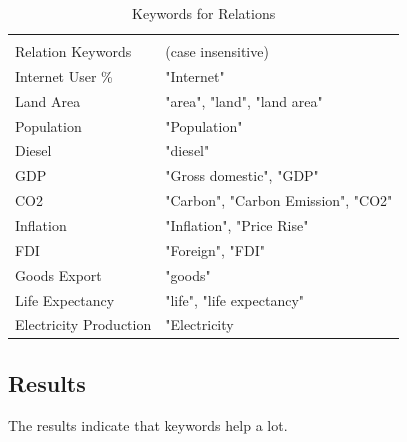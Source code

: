 \documentclass[a4paper,10pt]{article}
\begin{document}
\begin{center}
\begin{table}[H]
 \begin{tabular}{|l|l|}
\hline \\
 Relation Keywords & (case insensitive)\\
\hline
 Internet User \% &"Internet"\\
Land Area &"area", "land", "land area"\\
Population &"Population"\\
Diesel &"diesel"\\
GDP &"Gross domestic", "GDP"\\
CO2 &"Carbon", "Carbon Emission", "CO2"\\
Inflation &"Inflation", "Price Rise"\\
FDI &"Foreign", "FDI"\\
Goods Export & "goods"\\
Life Expectancy & "life", "life expectancy"\\
Electricity Production & "Electricity\\
\hline
\end{tabular}
\caption{Keywords for Relations}
\label{fig:kw}
\end{table}
 \end{center}

\subsection{Results}
The results indicate that keywords help a lot. 
\begin{table}[H]
\caption{Keyword Based}
\label{fig:kwres}
\end{table}
\end{document}
